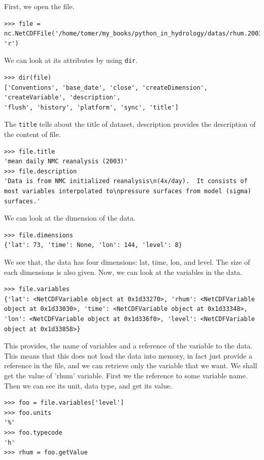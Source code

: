 \documentclass[10pt]{book}
\begin{document}
{First, we open the file. 
\beforeverb \begin{verbatim}
>>> file = nc.NetCDFFile('/home/tomer/my_books/python_in_hydrology/datas/rhum.2003.nc', 'r')
\end{verbatim} \afterverb

We can look at its attributes by using \verb"dir".
\beforeverb \begin{verbatim}
>>> dir(file)
['Conventions', 'base_date', 'close', 'createDimension', 'createVariable', 'description', 
'flush', 'history', 'platform', 'sync', 'title']
\end{verbatim} \afterverb

The \verb"title" tells about the title of dataset, description provides the description of the content of file. 
\beforeverb \begin{verbatim}
>>> file.title
'mean daily NMC reanalysis (2003)'
>>> file.description
'Data is from NMC initialized reanalysis\n(4x/day).  It consists of most variables interpolated to\npressure surfaces from model (sigma) surfaces.'
\end{verbatim} \afterverb

We can look at the dimension of the data.
\beforeverb \begin{verbatim}
>>> file.dimensions
{'lat': 73, 'time': None, 'lon': 144, 'level': 8}
\end{verbatim} \afterverb
We see that, the data has four dimensions: lat, time, lon, and level. The size of each dimensions is also given. Now, we can look at the variables in the data.

\beforeverb \begin{verbatim}
>>> file.variables
{'lat': <NetCDFVariable object at 0x1d33270>, 'rhum': <NetCDFVariable object at 0x1d33030>, 'time': <NetCDFVariable object at 0x1d33348>, 'lon': <NetCDFVariable object at 0x1d336f0>, 'level': <NetCDFVariable object at 0x1d33858>}
\end{verbatim} \afterverb

This provides, the name of variables and a reference of the variable to the data. This means that this does not load the data into memory, in fact just provide a reference in the file, and we can retrieve only the variable that we want. We shall get the value of 'rhum' variable. First we the reference to some variable name. Then we can see its unit, data type, and get its value.
\beforeverb \begin{verbatim}
>>> foo = file.variables['level']
>>> foo.units
'%'
>>> foo.typecode
'h'
>>> rhum = foo.getValue
\end{verbatim} \afterverb

}
\end{document}
